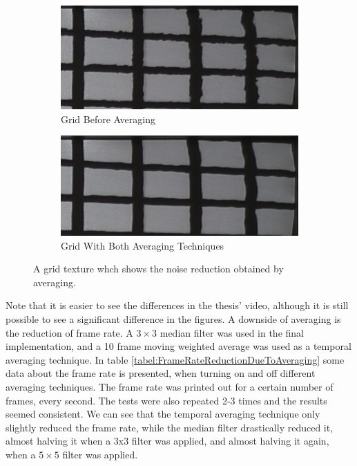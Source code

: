 \documentclass[]{article}
\begin{document}
\begin{figure}
\centering
\begin{subfigure}{.5\textwidth}
  \centering
  \includegraphics[width=0.9\linewidth]{figures/NoSmoothingC.png}
  \caption{Grid Before Averaging}
  \label{fig:GridNoAveraging}
\end{subfigure}%
\begin{subfigure}{.5\textwidth}
  \centering
  \includegraphics[width=0.9\linewidth]{figures/BothAveragingTechniquesC.png}
  \caption{Grid With Both Averaging Techniques}
  \label{fig:GridWithAveraging}
\end{subfigure}
\caption{A grid texture whch shows the noise reduction obtained by averaging.}
\label{fig:GridNoiseReduction}
\end{figure}

Note that it is easier to see the differences in the thesis' video, although it is still possible to see a significant difference in the figures. A downside of averaging is the reduction of frame rate. A $3 \times 3$ median filter was used in the final implementation, and a 10 frame moving weighted average was used as a temporal averaging technique. In table \ref{tabel:FrameRateReductionDueToAveraging} some data about the frame rate is presented, when turning on and off different averaging techniques. The frame rate was printed out for a certain number of frames, every second. The tests were also repeated 2-3 times and the results seemed consistent. We can see that the temporal averaging technique only slightly reduced the frame rate, while the median filter drastically reduced it, almost halving it when a 3x3 filter was applied, and almost halving it again, when a $5 \times 5$ filter was applied.
\end{document}
